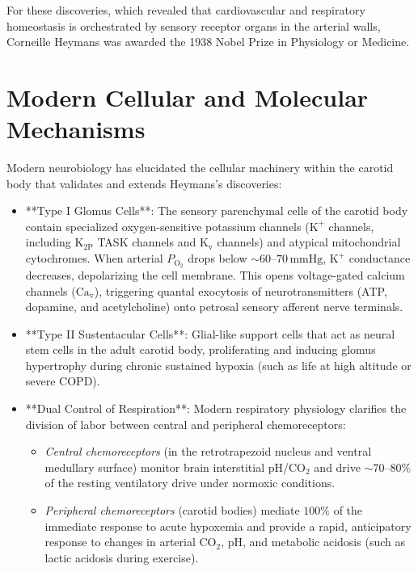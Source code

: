 For these discoveries, which revealed that cardiovascular and respiratory homeostasis is orchestrated by sensory receptor organs in the arterial walls, Corneille Heymans was awarded the 1938 Nobel Prize in Physiology or Medicine.

\section{Modern Cellular and Molecular Mechanisms}

Modern neurobiology has elucidated the cellular machinery within the carotid body that validates and extends Heymans's discoveries:
\begin{itemize}
    \item **Type I Glomus Cells**: The sensory parenchymal cells of the carotid body contain specialized oxygen-sensitive potassium channels ($\text{K}^+$ channels, including $\text{K}_{2\text{P}}$ TASK channels and $\text{K}_{\text{v}}$ channels) and atypical mitochondrial cytochromes. When arterial $P_{\text{O}_2}$ drops below $\sim 60\text{--}70\,\text{mmHg}$, $\text{K}^+$ conductance decreases, depolarizing the cell membrane. This opens voltage-gated calcium channels ($\text{Ca}_{\text{v}}$), triggering quantal exocytosis of neurotransmitters (ATP, dopamine, and acetylcholine) onto petrosal sensory afferent nerve terminals.
    \item **Type II Sustentacular Cells**: Glial-like support cells that act as neural stem cells in the adult carotid body, proliferating and inducing glomus hypertrophy during chronic sustained hypoxia (such as life at high altitude or severe COPD).
    \item **Dual Control of Respiration**: Modern respiratory physiology clarifies the division of labor between central and peripheral chemoreceptors:
      \begin{itemize}
          \item \emph{Central chemoreceptors} (in the retrotrapezoid nucleus and ventral medullary surface) monitor brain interstitial pH/$\text{CO}_2$ and drive $\sim 70\text{--}80\%$ of the resting ventilatory drive under normoxic conditions.
          \item \emph{Peripheral chemoreceptors} (carotid bodies) mediate $100\%$ of the immediate response to acute hypoxemia and provide a rapid, anticipatory response to changes in arterial $\text{CO}_2$, pH, and metabolic acidosis (such as lactic acidosis during exercise).
      \end{itemize}
\end{itemize}

